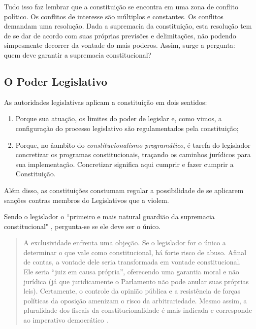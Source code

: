 \documentclass{article}
\begin{document}
Tudo isso faz lembrar que a constituição se encontra em uma zona de conflito político. Os conflitos de interesse são múltiplos e constantes. Os conflitos demandam uma resolução. Dada a supremacia da constituição, esta resolução tem de se dar de acordo com suas próprias previsões e delimitações, não podendo simpesmente decorrer da vontade do mais poderos. Assim, surge a pergunta: quem deve garantir a supremacia constitucional?

\subsection{O Poder Legislativo}

As autoridades legislativas aplicam a constituição em dois sentidos:

\begin{enumerate}
    \item Porque sua atuação, os limites do poder de legislar e, como vimos, a configuração do processo legislativo são regulamentados pela constituição;
    \item Porque, no âambito do \textit{constitucionalismo programático}, é tarefa do legislador concretizar os programas constitucionais, traçando os caminhos jurídicos para sua implementação. Concretizar significa aqui cumprir e fazer cumprir a Constituição.
\end{enumerate}

Além disso, as constituições constumam regular a possibilidade de se aplicarem sanções contras membros do Legislativos que a violem.

Sendo o legislador o ``primeiro e mais natural guardião da supremacia constitucional" \cite[p.~23]{dimoulis_curso_2016}, pergunta-se se ele deve ser o único.

\begin{quote}
    A exclusividade enfrenta uma objeção. Se o legislador for o único a determinar o que vale como constitucional, há forte risco de abuso. Afinal de contas, a vontade dele seria transformada em vontade constitucional. Ele seria “juiz em causa própria”, oferecendo uma garantia moral e não jurídica (já que juridicamente o Parlamento não pode anular suas próprias leis). Certamente, o controle da opinião pública e a resistência de forças políticas da oposição amenizam o risco da arbitrariedade. Mesmo assim, a pluralidade dos fiscais da constitucionalidade é mais indicada e corresponde ao imperativo democrático \cite[p.~24]{dimoulis_curso_2016}.
\end{quote}
\end{document}
